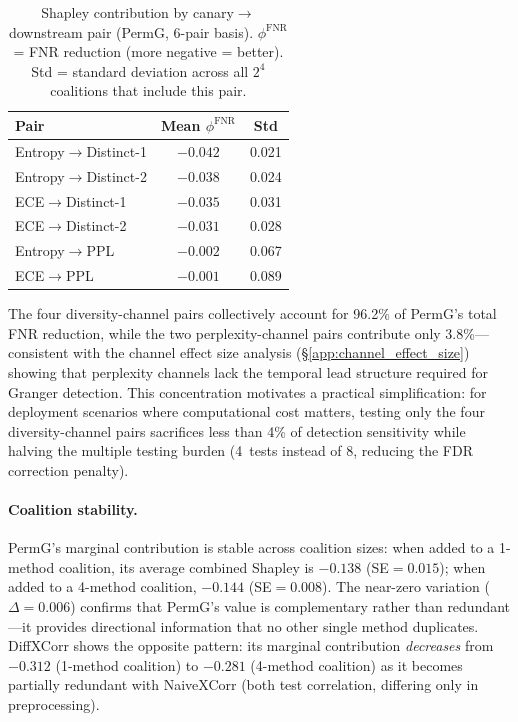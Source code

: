 \begin{table}[t]
\centering
\small
\caption{Shapley contribution by canary$\to$downstream pair (PermG, 6-pair basis). $\phi^{\text{FNR}}$ = FNR reduction (more negative = better). Std = standard deviation across all $2^4$ coalitions that include this pair.}
\label{tab:shapley_per_pair}
\begin{tabular}{lcc}
\toprule
Pair & Mean $\phi^{\text{FNR}}$ & Std \\
\midrule
Entropy$\to$Distinct-1 & $-0.042$ & 0.021 \\
Entropy$\to$Distinct-2 & $-0.038$ & 0.024 \\
ECE$\to$Distinct-1 & $-0.035$ & 0.031 \\
ECE$\to$Distinct-2 & $-0.031$ & 0.028 \\
Entropy$\to$PPL & $-0.002$ & 0.067 \\
ECE$\to$PPL & $-0.001$ & 0.089 \\
\bottomrule
\end{tabular}
\end{table}

The four diversity-channel pairs collectively account for 96.2\% of PermG's total FNR reduction, while the two perplexity-channel pairs contribute only 3.8\%---consistent with the channel effect size analysis (\S\ref{app:channel_effect_size}) showing that perplexity channels lack the temporal lead structure required for Granger detection.
This concentration motivates a practical simplification: for deployment scenarios where computational cost matters, testing only the four diversity-channel pairs sacrifices less than 4\% of detection sensitivity while halving the multiple testing burden (4~tests instead of 8, reducing the FDR correction penalty).

\paragraph{Coalition stability.}
PermG's marginal contribution is stable across coalition sizes: when added to a 1-method coalition, its average combined Shapley is $-0.138$ (SE${=}0.015$); when added to a 4-method coalition, $-0.144$ (SE${=}0.008$).
The near-zero variation ($\Delta{=}0.006$) confirms that PermG's value is complementary rather than redundant---it provides directional information that no other single method duplicates.
DiffXCorr shows the opposite pattern: its marginal contribution \emph{decreases} from $-0.312$ (1-method coalition) to $-0.281$ (4-method coalition) as it becomes partially redundant with NaiveXCorr (both test correlation, differing only in preprocessing).


